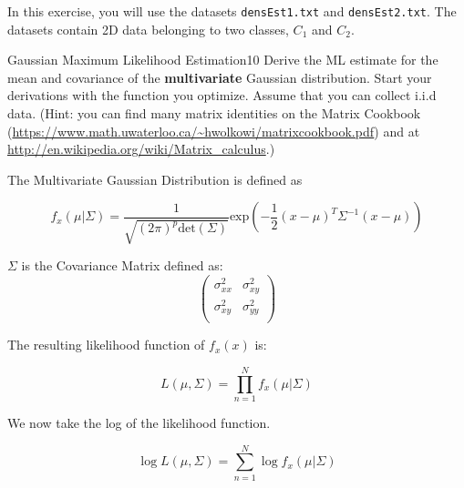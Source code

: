 \newif\ifvimbug
\vimbugfalse

\ifvimbug

\fi

In this exercise, you will use the datasets \texttt{densEst1.txt} 
and \texttt{densEst2.txt}. The datasets contain 2D data belonging
to two classes, $C_1$ and $C_2$.

\begin{questions}


\begin{question}{Gaussian Maximum Likelihood Estimation}{10}
Derive the ML estimate for the mean and covariance of the \textbf{multivariate} Gaussian distribution. Start your derivations with the function you optimize. Assume that you can collect i.i.d data. (Hint: you can find many matrix identities on the Matrix Cookbook (\url{https://www.math.uwaterloo.ca/~hwolkowi/matrixcookbook.pdf}) and at \url{http://en.wikipedia.org/wiki/Matrix_calculus}.)

\begin{answer}
The Multivariate Gaussian Distribution is defined as

\begin{equation}
	f_x(\mu|\Sigma) = \frac{1}{\sqrt{(2\pi)^p \text{det}(\Sigma)}} \text{exp} (-\frac{1}{2}(x-\mu)^T \Sigma^{-1} (x-\mu))
\end{equation}

$\Sigma$ is the Covariance Matrix defined as:
\begin{equation}
\begin{pmatrix}
	\sigma_{xx}^2 & \sigma_{xy}^2 \\
	\sigma_{xy}^2 & \sigma_{yy}^2 \\
\end{pmatrix}
\end{equation}

The resulting likelihood function of $f_x(x)$ is:

\begin{equation}
L(\mu, \Sigma) = \prod\limits_{n=1}^{N} f_x(\mu|\Sigma)
\end{equation}

We now take the log of the likelihood function. 

\begin{equation}
	\log L(\mu, \Sigma) = \sum_{n=1}^{N} \log f_x(\mu|\Sigma)
\end{equation}


\end{answer}
\end{question}
\end{questions}
